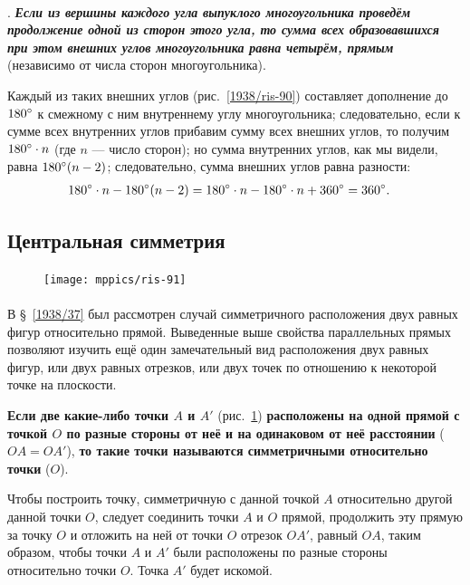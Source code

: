 \documentclass[oneside]{book}
\begin{document}
\paragraph{}\label{1938/83}
\mbox{.}
\textbf{\emph{Если из вершины каждого угла выпуклого многоугольника проведём продолжение одной из сторон этого угла, то сумма всех образовавшихся при этом внешних углов многоугольника равна четырём, прямым}} (независимо от числа сторон многоугольника).


Каждый из таких внешних углов (рис.~\ref{1938/ris-90}) составляет дополнение до $180\degree$ к смежному с ним внутреннему углу многоугольника;
следовательно, если к сумме всех внутренних углов прибавим сумму всех внешних углов, то получим $180\degree\cdot n$ (где $n$ — число сторон);
но сумма внутренних углов, как мы видели, равна $180\degree(n - 2)$;
следовательно, сумма внешних углов равна разности:
\begin{align*}
180\degree\cdot n-180\degree(n - 2)
&=180\degree\cdot n-180\degree\cdot n+360\degree=360\degree.
\end{align*}


\subsection*{Центральная симметрия}

\begin{figure}
\centering
\texttt{[image: mppics/ris-91]}
\caption{}\label{1938/ris-91}
\end{figure}

\paragraph{}\label{1938/84}
В §~\ref{1938/37} был рассмотрен случай симметричного расположения двух равных фигур относительно прямой.
Выведенные выше свойства параллельных прямых позволяют изучить ещё один замечательный вид расположения двух равных фигур, или двух равных отрезков, или двух точек по отношению к некоторой точке на плоскости.

\textbf{Если две какие-либо точки $A$ и $A'$} (рис.~\ref{1938/ris-91}) \textbf{расположены на одной прямой с точкой $O$ по разные стороны от неё и на одинаковом от неё расстоянии} ($OA=OA'$), \textbf{то такие точки называются симметричными относительно точки} ($O$).

Чтобы построить точку, симметричную с данной точкой $A$ относительно другой данной точки $O$, следует соединить точки $A$ и $O$ прямой, продолжить эту прямую за точку $O$ и отложить на ней от точки $O$ отрезок $OA'$, равный $OA$, таким образом, чтобы точки $A$ и $A'$ были расположены по разные стороны относительно точки $O$.
Точка $A'$ будет искомой.
\end{document}
